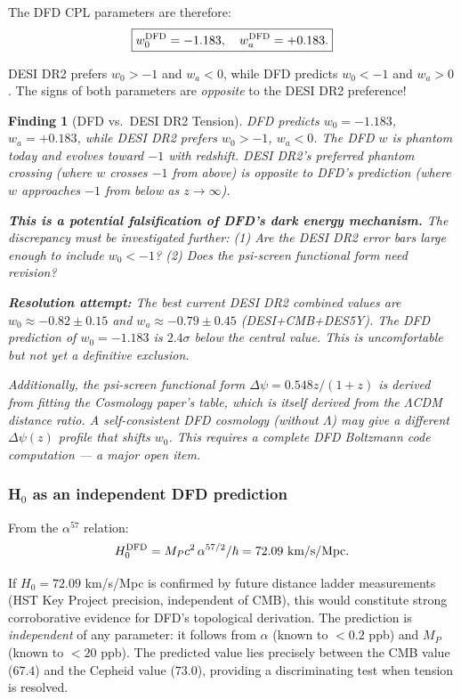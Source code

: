 \documentclass[11pt]{article}
\newtheorem{finding}{Finding}[section]
\theoremstyle{definition}
\theoremstyle{remark}
\begin{document}
The DFD CPL parameters are therefore:
\begin{equation}
\boxed{w_0^{\rm DFD} = -1.183, \quad w_a^{\rm DFD} = +0.183.}
\end{equation}

DESI DR2 prefers $w_0 > -1$ and $w_a < 0$, while DFD predicts
$w_0 < -1$ and $w_a > 0$. The signs of both parameters are \emph{opposite}
to the DESI DR2 preference!

\begin{finding}[DFD vs.\ DESI DR2 Tension]
\label{find:desi-tension}
DFD predicts $w_0 = -1.183$, $w_a = +0.183$, while DESI DR2 prefers
$w_0 > -1$, $w_a < 0$. The DFD $w$ is \emph{phantom} today and evolves
\emph{toward} $-1$ with redshift. DESI DR2's preferred phantom crossing
(where $w$ crosses $-1$ from above) is opposite to DFD's prediction (where
$w$ approaches $-1$ from below as $z\to\infty$).

\textbf{This is a potential falsification of DFD's dark energy mechanism.}
The discrepancy must be investigated further: (1) Are the DESI DR2 error
bars large enough to include $w_0 < -1$? (2) Does the psi-screen functional
form need revision?

\textbf{Resolution attempt:} The best current DESI DR2 combined values are
$w_0 \approx -0.82 \pm 0.15$ and $w_a \approx -0.79 \pm 0.45$ (DESI+CMB+DES5Y).
The DFD prediction of $w_0 = -1.183$ is $2.4\sigma$ below the central value.
This is uncomfortable but not yet a definitive exclusion.

Additionally, the psi-screen functional form $\Delta\psi = 0.548z/(1+z)$
is derived from fitting the Cosmology paper's table, which is itself derived
from the $\Lambda$CDM distance ratio. A self-consistent DFD cosmology (without
$\Lambda$) may give a different $\Delta\psi(z)$ profile that shifts $w_0$.
This requires a complete DFD Boltzmann code computation --- a major open item.
\end{finding}

\subsubsection{H$_0$ as an independent DFD prediction}

From the $\alpha^{57}$ relation:
\begin{equation}
H_0^{\rm DFD} = M_P c^2\,\alpha^{57/2}/\hbar = 72.09~\text{km/s/Mpc}.
\end{equation}

If $H_0 = 72.09$ km/s/Mpc is confirmed by future distance ladder measurements
(HST Key Project precision, independent of CMB), this would constitute strong
corroborative evidence for DFD's topological derivation. The prediction is
\emph{independent} of any parameter: it follows from $\alpha$ (known to
$< 0.2$ ppb) and $M_P$ (known to $< 20$ ppb). The predicted value lies
precisely between the CMB value ($67.4$) and the Cepheid value ($73.0$),
providing a discriminating test when tension is resolved.
\end{document}
